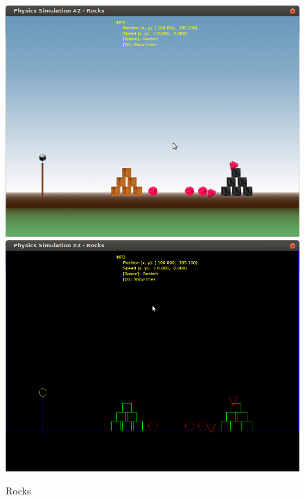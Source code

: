   \begin{figure}
	\centering
	\caption{Rocks}
    \includegraphics[scale=0.4]{images/rocks.png}
    \includegraphics[scale=0.4]{images/rocksE.png}
  \end{figure}


